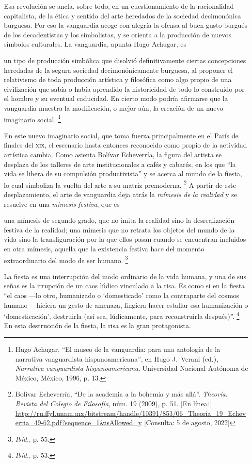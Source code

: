 \documentclass[14pt,twoside,final]{extbook} %
\let\oldfootnote\footnote
\renewcommand\footnote[1]{%
\oldfootnote{\hspace{1mm}#1}}
\begin{document}
Esa revolución se ancla, sobre todo, en un cuestionamiento de la racionalidad capitalista, de la ética y sentido del arte heredados de la sociedad decimonónica burguesa. Por eso la vanguardia acoge con alegría la ofensa al buen gusto burgués de los decadentistas y los simbolistas, y se orienta a la producción de nuevos símbolos culturales. La vanguardia, apunta Hugo Achugar, es
\begin{quoting}
un tipo de producción simbólica que disolvió definitivamente ciertas concepciones heredadas de la segura sociedad decimonónicamente burguesa, al proponer el relativismo de toda producción artística y
filosófica como algo propio de una civilización que sabía o había aprendido la historicidad de todo lo construido por el hombre y su eventual caducidad. En cierto modo podría afirmarse que la vanguardia muestra la modificación, o mejor aún, la creación de un nuevo imaginario social.\footnote{Hugo Achugar, ``El museo de la vanguardia: para una antología de la narrativa vanguardista hispanoamericana'', en Hugo J.~Verani (ed.), \emph{Narrativa vanguardista hispanoamericana}. Universidad Nacional Autónoma de México, México, 1996, p. 13.}
\end{quoting}
En este nuevo imaginario social, que toma fuerza principalmente en el París de finales del \textsc{xix}, el escenario hasta entonces reconocido como propio de la actividad artística cambia. Como asienta Bolívar Echeverría, la figura del artista se desplaza de los talleres de arte institucionales a cafés y cabarés, en los que ``la vida se libera de su compulsión productivista'' y se acerca al mundo de la fiesta, lo cual simboliza la vuelta del arte a su matriz premoderna.\footnote{Bolívar Echeverría, ``De la academia a la bohemia y más allá''. \emph{Theoría. Revista del Colegio de Filosofía}, núm. 19 (2009), p. 51. [En línea:] \url{http://ru.ffyl.unam.mx/bitstream/handle/10391/853/06_Theoria_19_Echeverria_49-62.pdf?sequence=1&isAllowed=y} [Consulta: 5 de agosto, 2022]} A partir de este desplazamiento, el arte de vanguardia deja atrás la \emph{mímesis de la realidad} y se resuelve en una \emph{mímesis festiva}, que es
\begin{quoting}
una mímesis de segundo grado, que no imita la realidad sino la desrealización festiva de la realidad; una mímesis que no retrata los objetos del mundo de la vida sino la transfiguración por la que ellos
pasan cuando se encuentran incluidos en otra mímesis, aquella que la existencia festiva hace del momento extraordinario del modo de ser humano.\footnote{\emph{Ibid.}, p. 55.}
\end{quoting}
La fiesta es una interrupción del modo ordinario de la vida humana, y una de sus señas es la irrupción de un caos lúdico vinculado a la risa. Es como si en la fiesta ``el caos ---lo otro, humanizado o `domesticado' como la contraparte del cosmos humano--- hiciera un gesto de amenaza,
fingiera hacer estallar esa humanización o `domesticación', destruirla (así sea, lúdicamente, para reconstruirla después)''.\footnote{\emph{Ibid.}, p. 53.} En esta destrucción de la fiesta, la risa es la gran protagonista.
\end{document}

